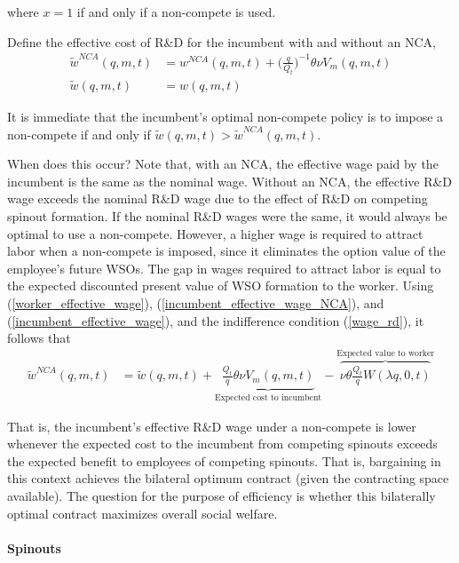\documentclass[11pt,english]{article}
\theoremstyle{remark}
\begin{document}
where $x = 1$ if and only if a non-compete is used. 

Define the effective cost of R\&D for the incumbent with and without an NCA,
\begin{align}
	\tilde{w}^{NCA}(q,m,t) &= w^{NCA}(q,m,t) + \Big(\frac{q}{Q_t}\Big)^{-1} \theta \nu V_m(q,m,t) \label{incumbent_effective_wage_NCA} \\
	\tilde{w}(q,m,t) &= w(q,m,t)  \label{incumbent_effective_wage}
\end{align}

It is immediate that the incumbent's optimal non-compete policy is to impose a non-compete if and only if $\tilde{w}(q,m,t) > \tilde{w}^{NCA}(q,m,t)$. 

When does this occur? Note that, with an NCA, the effective wage paid by the incumbent is the same as the nominal wage. Without an NCA, the effective R\&D wage exceeds the nominal R\&D wage due to the effect of R\&D on competing spinout formation. If the nominal R\&D wages were the same, it would always be optimal to use a non-compete. However, a higher wage is required to attract labor when a non-compete is imposed, since it eliminates the option value of the employee's future WSOs. The gap in wages required to attract labor is equal to the expected discounted present value of WSO formation to the worker. Using (\ref{worker_effective_wage}), (\ref{incumbent_effective_wage_NCA}), and (\ref{incumbent_effective_wage}), and the indifference condition (\ref{wage_rd}), it follows that
\begin{align}
	\tilde{w}^{NCA}(q,m,t) &= \tilde{w}(q,m,t) + \underbrace{\frac{Q_t}{q} \theta \nu V_m(q,m,t)}_{\textrm{Expected cost to incumbent}} - \overbrace{\nu \theta \frac{Q_t}{q} W(\lambda q,0,t)}^{\textrm{Expected value to worker}}
\end{align} 

That is, the incumbent's effective R\&D wage under a non-compete is lower whenever the expected cost to the incumbent from competing spinouts exceeds the expected benefit to employees of competing spinouts. That is, bargaining in this context achieves the bilateral optimum contract (given the contracting space available). The question for the purpose of efficiency is whether this bilaterally optimal contract maximizes overall social welfare.

\paragraph{Spinouts}
\end{document}
